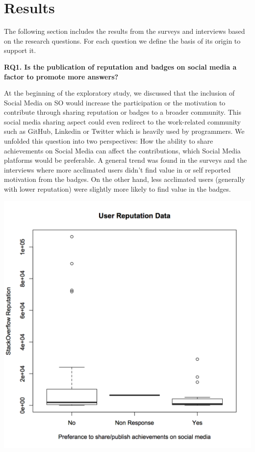 \documentclass{sigchi}
\begin{document}
\section{Results}

The following section includes the results from the surveys and interviews based on the research questions. For each question we define the basis of its origin to support it.

\textbf{RQ1. Is the publication of reputation and badges on social media a factor to promote more answers?}

At the beginning of the exploratory study, we discussed that the inclusion of Social Media on SO would increase the participation or the motivation to contribute through sharing reputation or badges to a broader community. This social media sharing aspect could even redirect to the work-related community such as GitHub, Linkedin or Twitter which is heavily used by programmers. We unfolded this question into two perspectives: How the ability to share achievements on Social Media can affect the contributions,  which Social Media platforms would be preferable. A general trend was found in the surveys and the interviews where more acclimated users didn't find value in or self reported motivation from the badges. On the other hand, less acclimated users (generally with lower reputation) were slightly more likely to find value in the badges.

\includegraphics[scale=0.5]{figures/boxplot_reputation_compare_publish_reputation_bool.png} 
\end{document}
